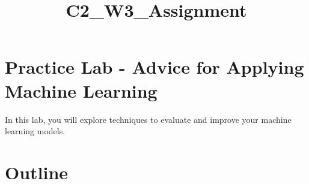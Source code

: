 \documentclass[11pt]{article}
\title{C2\_W3\_Assignment}
\begin{document}
    
    \maketitle
    
    

    
    \hypertarget{practice-lab---advice-for-applying-machine-learning}{%
\section{Practice Lab - Advice for Applying Machine
Learning}\label{practice-lab---advice-for-applying-machine-learning}}

In this lab, you will explore techniques to evaluate and improve your
machine learning models.

\hypertarget{outline}{%
\section{Outline}\label{outline}}
\end{document}
